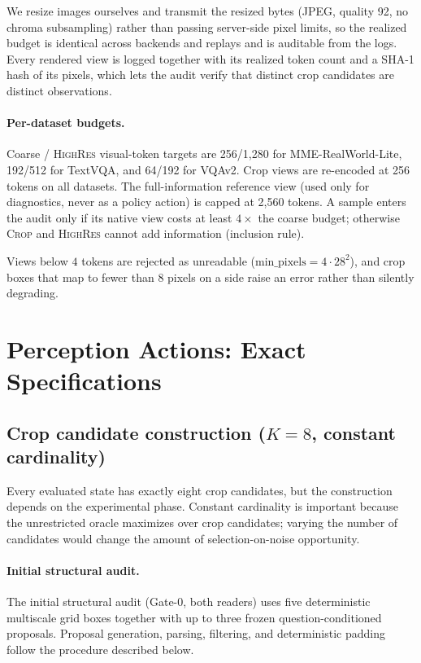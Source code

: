 \documentclass[10pt]{article}
\begin{document}
We resize images ourselves and transmit the resized bytes (JPEG, quality
92, no chroma subsampling) rather than passing server-side pixel limits, so
the realized budget is identical across backends and replays and is
auditable from the logs. Every rendered view is logged together with its
realized token count and a SHA-1 hash of its pixels, which lets the audit
verify that distinct crop candidates are distinct observations.

\paragraph{Per-dataset budgets.}
Coarse / \textsc{HighRes} visual-token targets are 256/1{,}280 for
MME-RealWorld-Lite, 192/512 for TextVQA, and 64/192 for VQAv2. Crop views
are re-encoded at 256 tokens on all datasets. The full-information
reference view (used only for diagnostics, never as a policy action) is
capped at 2{,}560 tokens. A sample enters the audit only if its native view
costs at least $4\times$ the coarse budget; otherwise \textsc{Crop} and
\textsc{HighRes} cannot add information (inclusion rule).

Views below $4$ tokens are rejected as unreadable
($\text{min\_pixels}=4\cdot28^2$), and crop boxes that map to fewer than
8 pixels on a side raise an error rather than silently degrading.

\section{Perception Actions: Exact Specifications}
\label{sec:actions}

\subsection{Crop candidate construction ($K=8$, constant cardinality)}

Every evaluated state has exactly eight crop candidates, but the
construction depends on the experimental phase. Constant cardinality is
important because the unrestricted oracle maximizes over crop candidates;
varying the number of candidates would change the amount of
selection-on-noise opportunity.

\paragraph{Initial structural audit.}
The initial structural audit (Gate-0, both readers) uses five deterministic
multiscale grid boxes together with up to three frozen question-conditioned
proposals. Proposal generation, parsing, filtering, and deterministic
padding follow the procedure described below.
\end{document}
